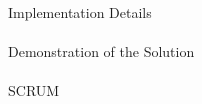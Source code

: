 \documentclass[
    ngerman,%
    authorontitle=true,
]{bfhbeamer}
\begin{document}
	\begin{frame}{Implementation Details}
		\framesubtitle{}
	\end{frame}


	\begin{frame}{Demonstration of the Solution}
		\framesubtitle{}
	\end{frame}

	\begin{frame}{SCRUM}
		\framesubtitle{}
	\end{frame}


\end{document}
